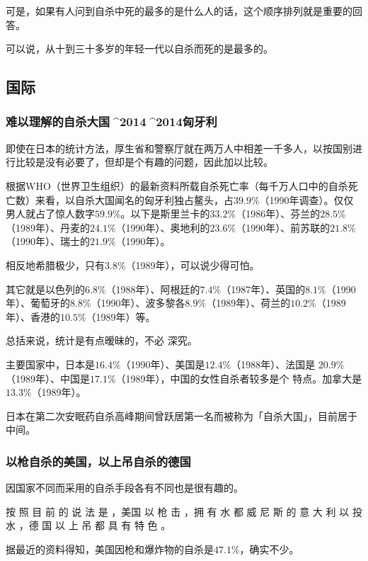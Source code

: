 \documentclass[UTF8]{ctexart}
\begin{document}
可是，如果有人问到自杀中死的最多的是什么人的话，这个顺序排列就是重要的回答。

可以说，从十到三十多岁的年轻一代以自杀而死的是最多的。

\subsection{国际}

\subsubsection*{难以理解的自杀大国^^^^2014^^^^2014匈牙利}

即使在日本的统计方法，厚生省和警察厅就在两万人中相差一千多人，以按国别进行比较是没有必要了，但却是个有趣的问题，因此加以比较。

根据WHO（世界卫生组织）的最新资料所载自杀死亡率（每千万人口中的自杀死亡数）来看，以自杀大国闻名的匈牙利独占鳌头，占$39.9\%$（1990年调查）。仅仅男人就占了惊人数字$59.9\%$。以下是斯里兰卡的$33.2\%$（1986年）、芬兰的$28.5\%$（1989年）、丹麦的$24.1\%$（1990年）、奥地利的$23.6\%$（1990年）、前苏联的$21.8\%$（1990年）、瑞士的$21.9\%$（1990年）。

相反地希腊极少，只有$3.8\%$（1989年），可以说少得可怕。

其它就是以色列的$6.8\%$（1988年）、阿根廷的$7.4\%$（1987年）、英国的$8.1\%$（1990年）、葡萄牙的$8.8\%$（1990年）、波多黎各$8.9\%$（1989年）、荷兰的$10.2\%$（1989年）、香港的$10.5\%$（1989年）等。

总括来说，统计是有点暧昧的，不必 深究。

主要国家中，日本是$16.4\%$（1990年）、美国是$12.4\%$（1988年）、法国是 $20.9\%$（1989年）、中国是$17.1\%$（1989年），中国的女性自杀者较多是个 特点。加拿大是$13.3\%$（1989年）。

日本在第二次安眠药自杀高峰期间曾跃居第一名而被称为「自杀大国」，目前居于中间。

\subsubsection*{以枪自杀的美国，以上吊自杀的德国}

因国家不同而采用的自杀手段各有不同也是很有趣的。

按 照 目 前 的 说 法 是 ，美国 以 枪 击 ，拥 有 水 都 威 尼 斯 的 意 大 利 以 投 水 ，德 国 以 上 吊 都 具 有 特 色 。

据最近的资料得知，美国因枪和爆炸物的自杀是$47.1\%$，确实不少。
\end{document}
